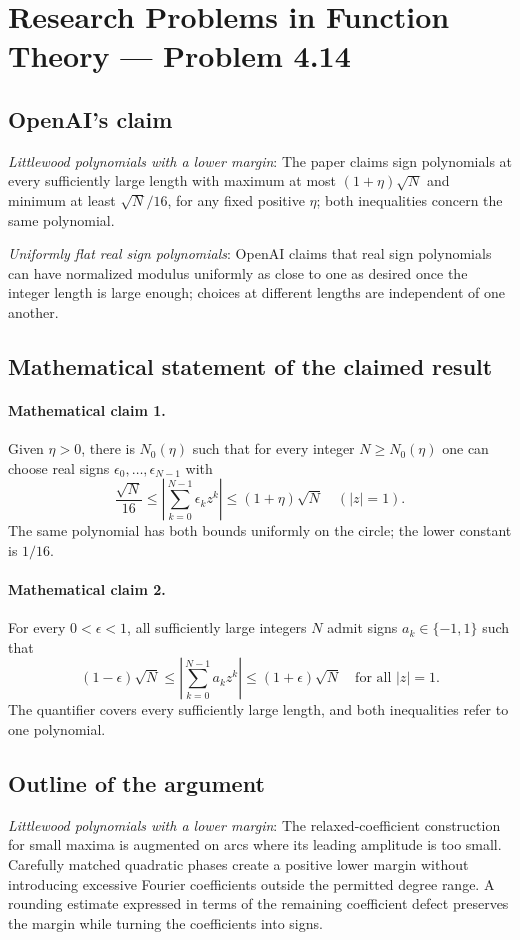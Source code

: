 \documentclass[11pt]{article}
\begin{document}
\section*{Research Problems in Function Theory — Problem 4.14}

\subsection{OpenAI's claim}
\textit{Littlewood polynomials with a lower margin}: The paper claims sign polynomials at every sufficiently large length with maximum at most $(1+\eta)\sqrt N$ and minimum at least $\sqrt N/16$, for any fixed positive $\eta$; both inequalities concern the same polynomial.

\textit{Uniformly flat real sign polynomials}: OpenAI claims that real sign polynomials can have normalized modulus uniformly as close to one as desired once the integer length is large enough; choices at different lengths are independent of one another.

\subsection{Mathematical statement of the claimed result}
\paragraph{Mathematical claim 1.} Given $\eta>0$, there is $N_0(\eta)$ such that for every integer $N\ge N_0(\eta)$ one can choose real signs $\epsilon_0,\ldots,\epsilon_{N-1}$ with \[\frac{\sqrt N}{16}\le\left|\sum_{k=0}^{N-1}\epsilon_kz^k\right|\le(1+\eta)\sqrt N\quad(|z|=1).\] The same polynomial has both bounds uniformly on the circle; the lower constant is $1/16$.

\paragraph{Mathematical claim 2.} For every $0<\epsilon<1$, all sufficiently large integers $N$ admit signs $a_k\in\{-1,1\}$ such that \[(1-\epsilon)\sqrt N\le\left|\sum_{k=0}^{N-1}a_kz^k\right|\le(1+\epsilon)\sqrt N\quad\text{for all }|z|=1.\] The quantifier covers every sufficiently large length, and both inequalities refer to one polynomial.

\subsection{Outline of the argument}
\textit{Littlewood polynomials with a lower margin}: The relaxed-coefficient construction for small maxima is augmented on arcs where its leading amplitude is too small. Carefully matched quadratic phases create a positive lower margin without introducing excessive Fourier coefficients outside the permitted degree range. A rounding estimate expressed in terms of the remaining coefficient defect preserves the margin while turning the coefficients into signs.
\end{document}
